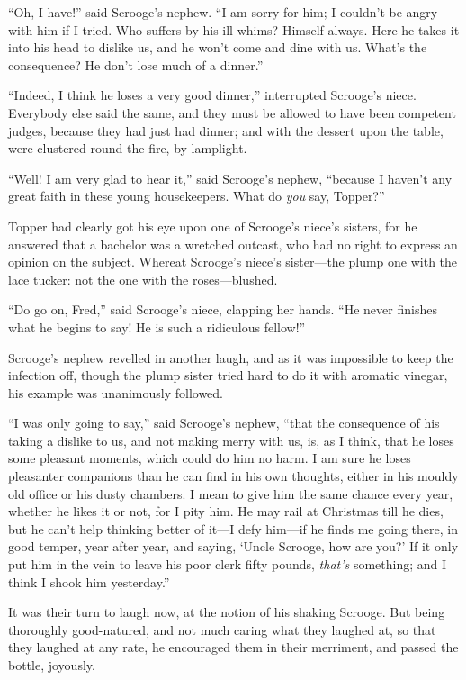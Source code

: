 \documentclass[paper=5.5in:8.5in,BCOR=15mm,twoside,DIV=15,headinclude=off,12pt,chapterprefix=off,openany,headings=huge]{scrbook} %
\begin{document}
\enquote{Oh, I have!} said Scrooge's nephew. \enquote{I am sorry for him; I couldn't be angry with him if I tried. Who suffers by his ill whims? Himself always. Here he takes it into his head to dislike us, and he won't come and dine with us. What's the consequence? He don't lose much of a dinner.}

\enquote{Indeed, I think he loses a very good dinner,} interrupted Scrooge's niece. Everybody else said the same, and they must be allowed to have been competent judges, because they had just had dinner; and with the dessert upon the table, were clustered round the fire, by lamplight.

\enquote{Well! I am very glad to hear it,} said Scrooge's nephew, \enquote{because I haven't any great faith in these young housekeepers. What do \textit{you} say, Topper?}

Topper had clearly got his eye upon one of Scrooge's niece's sisters, for he answered that a bachelor was a wretched outcast, who had no right to express an opinion on the subject. Whereat Scrooge's niece's sister—the plump one with the lace tucker: not the one with the roses—blushed.

\enquote{Do go on, Fred,} said Scrooge's niece, clapping her hands. \enquote{He never finishes what he begins to say! He is such a ridiculous fellow!}

Scrooge's nephew revelled in another laugh, and as it was impossible to keep the infection off, though the plump sister tried hard to do it with aromatic vinegar, his example was unanimously followed.

\enquote{I was only going to say,} said Scrooge's nephew, \enquote{that the consequence of his taking a dislike to us, and not making merry with us, is, as I think, that he loses some pleasant moments, which could do him no harm. I am sure he loses pleasanter companions than he can find in his own thoughts, either in his mouldy old office or his dusty chambers. I mean to give him the same chance every year, whether he likes it or not, for I pity him. He may rail at Christmas till he dies, but he can't help thinking better of it—I defy him—if he finds me going there, in good temper, year after year, and saying, \enquote{Uncle Scrooge, how are you?} If it only put him in the vein to leave his poor clerk fifty pounds, \textit{that's} something; and I think I shook him yesterday.}

It was their turn to laugh now, at the notion of his shaking Scrooge. But being thoroughly good-natured, and not much caring what they laughed at, so that they laughed at any rate, he encouraged them in their merriment, and passed the bottle, joyously.
\end{document}
